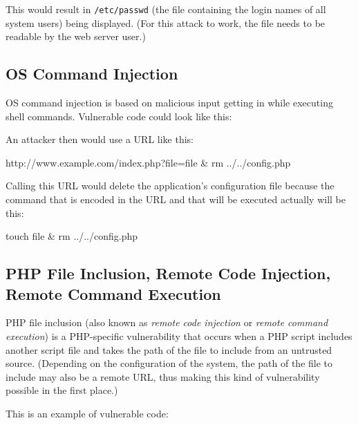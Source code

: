This would result in \texttt{/etc/passwd} (the file containing the login names of all system users) being displayed. (For this attack to work, the file needs to be readable by the web server user.)


\subsection{OS Command Injection}
\label{os-command-injection}
OS command injection is based on malicious input getting in while executing shell commands. Vulnerable code could look like this:


An attacker then would use a URL like this:

\begin{textcode}
http://www.example.com/index.php?file=file & rm ../../config.php
\end{textcode}

Calling this URL would delete the application's configuration file because the command that is encoded in the URL and that will be executed actually will be this:

\begin{textcode}
touch file & rm ../../config.php
\end{textcode}


\subsection{PHP File Inclusion, Remote Code Injection, Remote Command Execution}
\label{remote-command-injection}
PHP file inclusion (also known as \emph{remote code injection} or \emph{remote command execution}) is a PHP-specific vulnerability that occurs when a PHP script includes another script file and takes the path of the file to include from an untrusted source. (Depending on the configuration of the system, the path of the file to include may also be a remote URL, thus making this kind of vulnerability possible in the first place.)

This is an example of vulnerable code:


